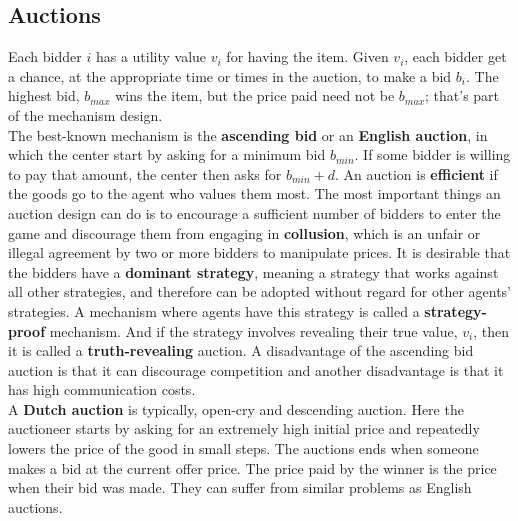 \documentclass[twoside]{article}
\begin{document}
\subsection{Auctions}
Each bidder \(i\) has a utility value \(v_i\) for having the item. Given \(v_i\),
each bidder get a chance, at the appropriate time or times in the auction, to 
make a bid \(b_i\). The highest bid, \(b_{max}\) wins the item, but the price 
paid need not be \(b_{max}\); that's part of the mechanism design.\\

The best-known mechanism is the \textbf{ascending bid} or an \textbf{English 
auction}, in which the center start by asking for a minimum bid \(b_{min}\). If
some bidder is willing to pay that amount, the center then asks for \(b_{min}+d\).
An auction is \textbf{efficient} if the goods go to the agent who values them 
most. The most important things an auction design can do is to encourage a 
sufficient number of bidders to enter the game and discourage them from engaging
in \textbf{collusion}, which is an unfair or illegal agreement by two or more 
bidders to manipulate prices. It is desirable that the bidders have a \textbf{
dominant strategy}, meaning a strategy that works against all other strategies,
and therefore can be adopted without regard for other agents' strategies. A 
mechanism where agents have this strategy is called a \textbf{strategy-proof} 
mechanism. And if the strategy involves revealing their true value, \(v_i\), then
it is called a \textbf{truth-revealing} auction. A disadvantage of the ascending
bid auction is that it can discourage competition and another disadvantage is 
that it has high communication costs.\\

A \textbf{Dutch auction} is typically, open-cry and descending auction. Here the
auctioneer starts by asking for an extremely high initial price and repeatedly 
lowers the price of the good in small steps. The auctions ends when someone 
makes a bid at the current offer price. The price paid by the winner is the 
price when their bid was made. They can suffer from similar problems as English
auctions. \\
\end{document}
